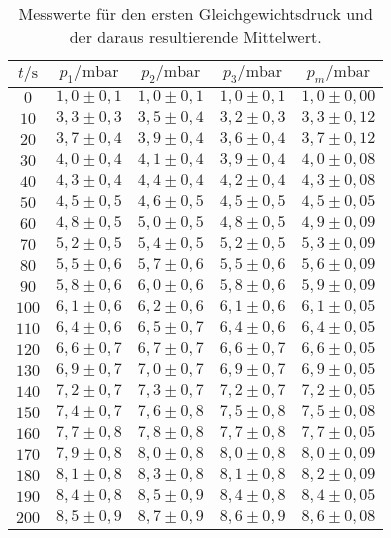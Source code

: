 \begin{table}[H]
  \centering
  \caption{Messwerte für den ersten Gleichgewichtsdruck und der daraus resultierende Mittelwert.}
  \label{tab:pm}
  \begin{tabular}{c c c c c}
    \toprule
  $t/\si{\second}$ & $p_1 /\si{\milli\bar}$ & $p_2 /\si{\milli\bar}$ & $p_3 /\si{\milli\bar}$ & $p_m /\si{\milli\bar}$ \\
    \midrule
    $  0$ & $ 1,0 \pm 0,1 $ & $ 1,0 \pm 0,1 $ & $ 1,0 \pm 0,1 $& $ 1,0 \pm 0,00 $ \\ 
    $ 10$ & $ 3,3 \pm 0,3 $ & $ 3,5 \pm 0,4 $ & $ 3,2 \pm 0,3 $& $ 3,3 \pm 0,12 $ \\ 
    $ 20$ & $ 3,7 \pm 0,4 $ & $ 3,9 \pm 0,4 $ & $ 3,6 \pm 0,4 $& $ 3,7 \pm 0,12 $ \\ 
    $ 30$ & $ 4,0 \pm 0,4 $ & $ 4,1 \pm 0,4 $ & $ 3,9 \pm 0,4 $& $ 4,0 \pm 0,08 $ \\ 
    $ 40$ & $ 4,3 \pm 0,4 $ & $ 4,4 \pm 0,4 $ & $ 4,2 \pm 0,4 $& $ 4,3 \pm 0,08 $ \\ 
    $ 50$ & $ 4,5 \pm 0,5 $ & $ 4,6 \pm 0,5 $ & $ 4,5 \pm 0,5 $& $ 4,5 \pm 0,05 $ \\ 
    $ 60$ & $ 4,8 \pm 0,5 $ & $ 5,0 \pm 0,5 $ & $ 4,8 \pm 0,5 $& $ 4,9 \pm 0,09 $ \\ 
    $ 70$ & $ 5,2 \pm 0,5 $ & $ 5,4 \pm 0,5 $ & $ 5,2 \pm 0,5 $& $ 5,3 \pm 0,09 $ \\ 
    $ 80$ & $ 5,5 \pm 0,6 $ & $ 5,7 \pm 0,6 $ & $ 5,5 \pm 0,6 $& $ 5,6 \pm 0,09 $ \\ 
    $ 90$ & $ 5,8 \pm 0,6 $ & $ 6,0 \pm 0,6 $ & $ 5,8 \pm 0,6 $& $ 5,9 \pm 0,09 $ \\ 
    $100$ & $ 6,1 \pm 0,6 $ & $ 6,2 \pm 0,6 $ & $ 6,1 \pm 0,6 $& $ 6,1 \pm 0,05 $ \\ 
    $110$ & $ 6,4 \pm 0,6 $ & $ 6,5 \pm 0,7 $ & $ 6,4 \pm 0,6 $& $ 6,4 \pm 0,05 $ \\ 
    $120$ & $ 6,6 \pm 0,7 $ & $ 6,7 \pm 0,7 $ & $ 6,6 \pm 0,7 $& $ 6,6 \pm 0,05 $ \\ 
    $130$ & $ 6,9 \pm 0,7 $ & $ 7,0 \pm 0,7 $ & $ 6,9 \pm 0,7 $& $ 6,9 \pm 0,05 $ \\ 
    $140$ & $ 7,2 \pm 0,7 $ & $ 7,3 \pm 0,7 $ & $ 7,2 \pm 0,7 $& $ 7,2 \pm 0,05 $ \\ 
    $150$ & $ 7,4 \pm 0,7 $ & $ 7,6 \pm 0,8 $ & $ 7,5 \pm 0,8 $& $ 7,5 \pm 0,08 $ \\ 
    $160$ & $ 7,7 \pm 0,8 $ & $ 7,8 \pm 0,8 $ & $ 7,7 \pm 0,8 $& $ 7,7 \pm 0,05 $ \\ 
    $170$ & $ 7,9 \pm 0,8 $ & $ 8,0 \pm 0,8 $ & $ 8,0 \pm 0,8 $& $ 8,0 \pm 0,09 $ \\ 
    $180$ & $ 8,1 \pm 0,8 $ & $ 8,3 \pm 0,8 $ & $ 8,1 \pm 0,8 $& $ 8,2 \pm 0,09 $ \\ 
    $190$ & $ 8,4 \pm 0,8 $ & $ 8,5 \pm 0,9 $ & $ 8,4 \pm 0,8 $& $ 8,4 \pm 0,05 $ \\ 
    $200$ & $ 8,5 \pm 0,9 $ & $ 8,7 \pm 0,9 $ & $ 8,6 \pm 0,9 $& $ 8,6 \pm 0,08 $ \\ 
    \bottomrule
  \end{tabular}
\end{table}

